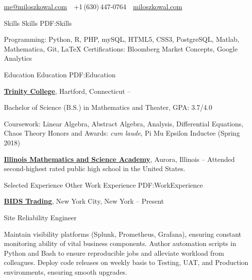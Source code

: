\documentclass[letterpaper,MMMyyyy,nonstopmode]{simpleresumecv}
\newcommand{\CVAuthor}{Milosz Kowal}
\newcommand{\CVWebpage}{https://miloszkowal.com}
\begin{document}

\Title{\CVAuthor}

\begin{SubTitle}
\par
\href{mailto:me@miloszkowal.com}
{me@miloszkowal.com}
\,\SubBulletSymbol\,
+1\,(630)\,447-0764
\,\SubBulletSymbol\,
\href{\CVWebpage}
{miloszkowal.com}
\end{SubTitle}

\begin{Body}


\Section
{Skills}
{Skills}
{PDF:Skills}

\Entry
Programming: Python, R, PHP, mySQL, HTML5, CSS3, PostgreSQL, Matlab, Mathematica, Git, \LaTeX{} \hfill\break{}
Certifications: Bloomberg Market Concepts, Google Analytics


\hrulefill
\Section
{Education}
{Education}
{PDF:Education}

\Entry
\href{http://www.trincoll.edu}
{\textbf{Trinity College}},
Hartford, Connecticut
\hfill
{} --

\Gap
\BulletItem
Bachelor of Science (B.S.) in
Mathematics and Theater, GPA: 3.7/4.0
\begin{Detail}
\SubBulletItem
Coursework: Linear Algebra, Abstract Algebra, Analysis, Differential Equations, Chaos Theory
\SubBulletItem
Honors and Awards: \textit{cum laude}, Pi Mu Epsilon Inductee (Spring 2018)
\end{Detail}

\BigGap
\Entry
\href{http://www.imsa.edu}
{\textbf{Illinois Mathematics and Science Academy}},
Aurora, Illinois
\hfill
{} --
\Gap
\BulletItem
Attended second-highest rated public high school in the United States.


\hrulefill
\Section
{Selected\newline
Experience}
{Other Work Experience}
{PDF:WorkExperience}

\Entry
\href{https://www.bidstrading.com/}
{\textbf{BIDS Trading}},
New York City, New York
\hfill
{} --
Present

\Gap
\BulletItem
Site Reliability Engineer
\begin{Detail}
\SubBulletItem
Maintain visibility platforms (Splunk, Prometheus, Grafana), ensuring constant monitoring ability of vital business components.
\SubBulletItem
Author automation scripts in Python and Bash to ensure reproducible jobs and alleviate workload from colleagues. 
\SubBulletItem
Deploy code releases on weekly basis to Testing, UAT, and Production environments, ensuring smooth upgrades.
\end{Detail}


\end{Body}
\end{document}
